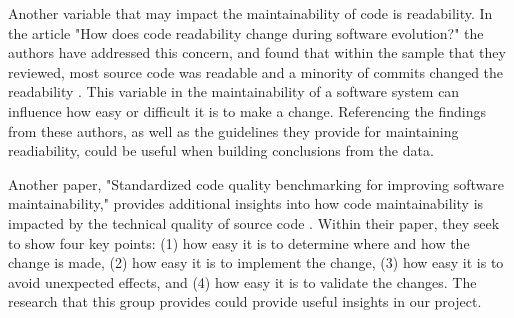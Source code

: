 \documentclass[conference]{IEEEtran}
\begin{document}
Another variable that may impact the maintainability of code is readability. In the article "How does code readability change during software evolution?" the authors have addressed this concern, and found that within the sample that they reviewed, most source code was readable and a minority of commits changed the readability \cite{piantadosi:2020}. This variable in the maintainability of a software system can influence how easy or difficult it is to make a change. Referencing the findings from these authors, as well as the guidelines they provide for maintaining readiability, could be useful when building conclusions from the data.

Another paper, "Standardized code quality benchmarking for improving software maintainability," provides additional insights into how code maintainability is impacted by the technical quality of source code \cite{baggen:2012}. Within their paper, they seek to show four key points: (1) how easy it is to determine where and how the change is made, (2) how easy it is to implement the change, (3) how easy it is to avoid unexpected effects, and (4) how easy it is to validate the changes. The research that this group provides could provide useful insights in our project.

\newpage


\end{document}
